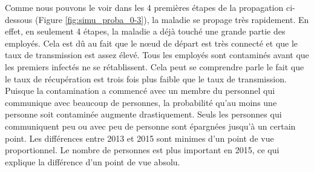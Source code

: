 \documentclass{article}
\begin{document}
Comme nous pouvons le voir dans les 4 premières étapes de la propagation ci-dessous (Figure \ref{fig:simu_proba_0-3}), la maladie se propage très rapidement. En effet, en seulement 4 étapes, la maladie a déjà touché une grande partie des employés. Cela est dû au fait que le nœud de départ est très connecté et que le taux de transmission est assez élevé. Tous les employés sont contaminés avant que les premiers infectés ne se rétablissent. Cela peut se comprendre parle le fait que le taux de récupération est trois fois plus faible que le taux de transmission. Puisque la contamination a commencé avec un membre du personnel qui communique avec beaucoup de personnes, la probabilité qu'au moins une personne soit contaminée augmente drastiquement. Seuls les personnes qui communiquent peu ou avec peu de personne sont épargnées jusqu'à un certain point. Les différences entre 2013 et 2015 sont minimes d'un point de vue proportionnel. Le nombre de personnes est plus important en 2015, ce qui explique la différence d'un point de vue absolu.
\end{document}
